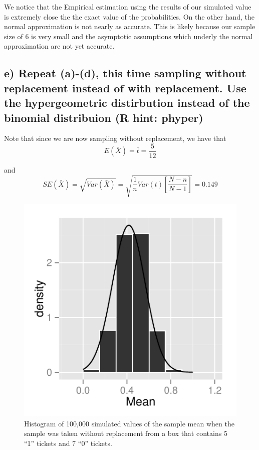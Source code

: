 \documentclass[11pt]{article}
\begin{document}
\noindent We notice that the Empirical estimation using the results of our simulated value is extremely close the the exact value of the probabilities. On the other hand, the normal approximation is not nearly as accurate. This is likely because our sample size of 6 is very small and the asymptotic assumptions which underly the normal approximation are not yet accurate.



\subsection*{e) Repeat (a)-(d), this time sampling without replacement instead of with replacement. Use the hypergeometric distirbution instead of the binomial distribuion (R hint: phyper)}


\noindent Note that since we are now sampling without replacement, we have that
$$E(\bar{X}) = \bar{t} = \frac{5}{12}$$

\noindent and
$$SE(\bar{X}) = \sqrt{Var(\bar{X})} = \sqrt{\frac{1}{n} Var(t) \left[\frac{N - n}{N - 1}\right]} = 0.149$$


\begin{figure}[H]
\centering
\includegraphics[width = .5\textwidth]{histogram_1e-1.pdf}
\caption{Histogram of 100,000 simulated values of the sample mean when the sample was taken without replacement from a box that contains 5 ``1'' tickets and 7 ``0'' tickets.}
\end{figure}
\end{document}
